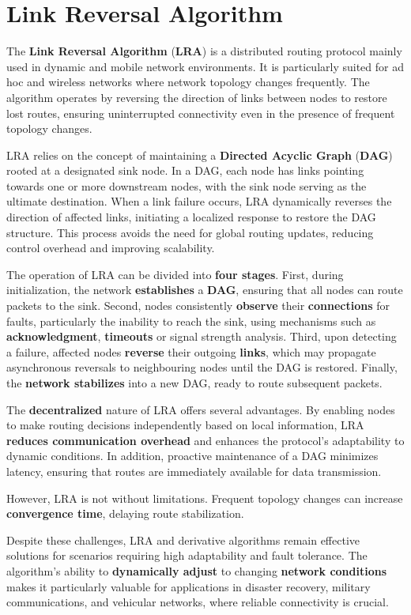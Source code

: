 \documentclass[../report.tex]{subfiles}
\begin{document}
\section{Link Reversal Algorithm}
The \textbf{Link Reversal Algorithm} (\textbf{LRA}\cite{gafni1981distributed}) is a distributed routing protocol mainly used in dynamic and mobile network environments. It is particularly suited for ad hoc and wireless networks where network topology changes frequently. The algorithm operates by reversing the direction of links between nodes to restore lost routes, ensuring uninterrupted connectivity even in the presence of frequent topology changes.

LRA relies on the concept of maintaining a \textbf{Directed Acyclic Graph} (\textbf{DAG}) rooted at a designated sink node. In a DAG, each node has links pointing towards one or more downstream nodes, with the sink node serving as the ultimate destination. When a link failure occurs, LRA dynamically reverses the direction of affected links, initiating a localized response to restore the DAG structure. This process avoids the need for global routing updates, reducing control overhead and improving scalability.

The operation of LRA can be divided into \textbf{four stages}. First, during initialization, the network \textbf{establishes} a \textbf{DAG}, ensuring that all nodes can route packets to the sink. Second, nodes consistently \textbf{observe} their \textbf{connections} for faults, particularly the inability to reach the sink, using mechanisms such as \textbf{acknowledgment}, \textbf{timeouts} or signal strength analysis. Third, upon detecting a failure, affected nodes \textbf{reverse} their outgoing \textbf{links}, which may propagate asynchronous reversals to neighbouring nodes until the DAG is restored. Finally, the \textbf{network stabilizes} into a new DAG, ready to route subsequent packets.

The \textbf{decentralized} nature of LRA offers several advantages. By enabling nodes to make routing decisions independently based on local information, LRA \textbf{reduces communication overhead} and enhances the protocol’s adaptability to dynamic conditions. In addition, proactive maintenance of a DAG minimizes latency, ensuring that routes are immediately available for data transmission.

However, LRA is not without limitations. Frequent topology changes can increase \textbf{convergence time}, delaying route stabilization. 

Despite these challenges, LRA and derivative algorithms remain effective solutions for scenarios requiring high adaptability and fault tolerance. The algorithm’s ability to \textbf{dynamically adjust} to changing \textbf{network conditions} makes it particularly valuable for applications in disaster recovery, military communications, and vehicular networks, where reliable connectivity is crucial.
\end{document}
